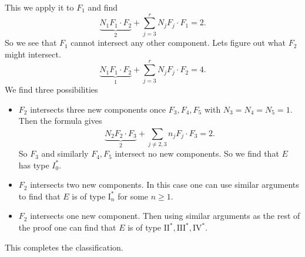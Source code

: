 This we apply it to $F_1$ and find \[
	\underbrace{N_1 F_1 \cdot  F_2}_{2} + \sum_{j = 3}^{r} N_j F_j\cdot F_1 = 2
.\] 
So we see that $F_1$ cannot intersect any other component. 
Lets figure out what $F_2$ might intersect. 
\[
	\underbrace{N_1 F_1 \cdot F_2}_1 + \sum_{j = 3}^{r} N_j F_j \cdot F_2 = 4
.\] 
We find three possibilities
\begin{itemize}
	\item $F_2$ intersects three new components once $F_3, F_4, F_5$ with $N_3 = N_4 = N_5 = 1$. 
		Then the formula gives \[
			\underbrace{N_2F_2 \cdot  F_3}_{2} + \sum_{j \ne 2,3}^{}n_j F_j \cdot  F_3 = 2 
		.\] 
		So $F_3$ and similarly $F_4, F_5$ intersect no new components. 
		So we find that $E$ has type $I_0^*$.
	\item  $F_2$ intersects two new components. 
		In this case one can use similar arguments to find that $E$ is of type $\mathrm I_n^*$ for some $n \ge 1$. 
	\item $F_2$ intersects one new component. 
		Then using similar arguments as the rest of the proof one can find that $E$ is of type $\mathrm{II}^*, \mathrm{III}^*, \mathrm{IV}^*$.
\end{itemize}
This completes the classification. 


